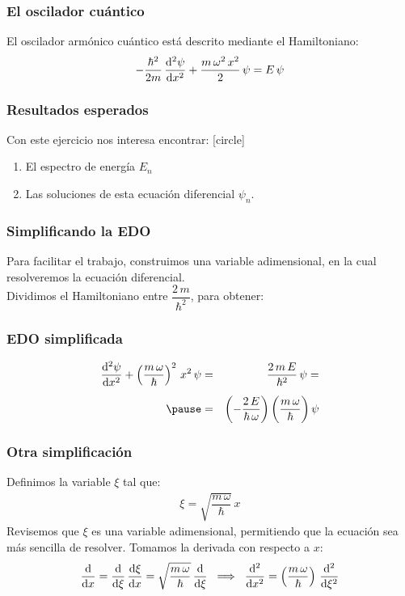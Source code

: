 \documentclass[12pt]{beamer}
\begin{document}
\begin{frame}
\frametitle{El oscilador cuántico}
El oscilador armónico cuántico está descrito mediante el Hamiltoniano:
\pause
\begin{align*}
- \dfrac{\hbar^{2}}{2 m} \, \dv[2]{\psi}{x} + \dfrac{m \, \omega^{2} \, x^{2}}{2} \, \psi = E \, \psi
\end{align*}
\end{frame}
\begin{frame}
\frametitle{Resultados esperados}
Con este ejercicio nos interesa encontrar:
[circle]
\begin{enumerate}[<+->]
\item El espectro de energía $E_{n}$
\item Las soluciones de esta ecuación diferencial $\psi_{n}$.
\end{enumerate}
\end{frame}
\begin{frame}
\frametitle{Simplificando la EDO}
Para facilitar el trabajo, construimos una variable adimensional, en la cual resolveremos la ecuación diferencial.
\\
\bigskip
\pause
Dividimos el Hamiltoniano entre $\dfrac{2 \, m}{\hbar^{2}}$, para obtener:
\end{frame}
\begin{frame}
\frametitle{EDO simplificada}
\begin{eqnarray*}
\dv[2]{\psi}{x}  + \left( \dfrac{m \, \omega}{\hbar} \right)^{2} \, x^{2} \, \psi &=&  \dfrac{2 \, m \, E}{\hbar^{2}} \, \psi =  \\[0.5em] \pause
&=& \left( - \dfrac{2 \, E}{\hbar \, \omega} \right) \bigg( \dfrac{m \, \omega}{\hbar} \bigg) \, \psi
\end{eqnarray*}
\end{frame}
\begin{frame}
\frametitle{Otra simplificación}
Definimos la variable $\xi$ tal que:
\pause
\begin{align*}
\xi = \sqrt{\dfrac{m \, \omega}{\hbar}} \, x
\end{align*}
Revisemos que $\xi$ es una variable adimensional, permitiendo que la ecuación sea más sencilla de resolver.
\pause
Tomamos la derivada con respecto a $x$:
\pause
\begin{align*}
\dv{x} = \dv{\xi} \, \dv{\xi}{x} = \sqrt{\dfrac{m \, \omega}{\hbar}} \, \dv{\xi} \hspace{0.2cm} \Longrightarrow \hspace{0.2cm} \dv[2]{x} = \left( \dfrac{m \, \omega}{\hbar} \right) \, \dv[2]{\xi}
\end{align*}
\end{frame}
\end{document}
